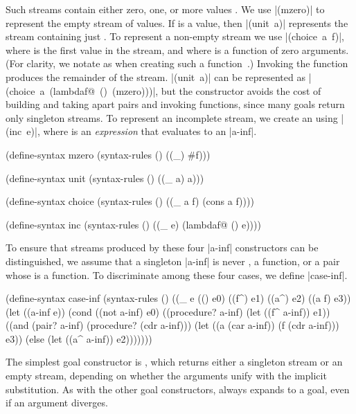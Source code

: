 Such streams contain either zero, one, or more values
\cite{backtracking,CombinatorsforLP%
}.  We use
\mbox{\scheme|(mzero)|} to represent the empty stream of
values. If  is a value, then
\mbox{\scheme|(unit a)|} represents the stream containing
just .  To represent a non-empty stream
we use \mbox{\scheme|(choice a f)|}, where 
is the first value in the stream, and where  is a
function of zero arguments.  (For clarity, we notate 
as  when creating such a function~.)
Invoking the function  produces the remainder of the
stream.
\mbox{\scheme|(unit a)|} can be represented as
\mbox{\scheme|(choice a (lambdaf@ () (mzero)))|}, but the
 constructor avoids the cost of building and taking apart
pairs and invoking functions, since many goals return 
only singleton streams.
To represent an incomplete stream, we create an  using \mbox{\scheme|(inc e)|}, 
where  is an \emph{expression} that evaluates to an \mbox{\scheme|a-inf|}.

\schemedisplayspace
\begin{schemedisplay}
(define-syntax mzero 
  (syntax-rules () 
    ((_) #f)))

(define-syntax unit
  (syntax-rules ()
    ((_ a) a)))

(define-syntax choice
  (syntax-rules ()
    ((_ a f) (cons a f))))

(define-syntax inc
  (syntax-rules ()
    ((_ e) (lambdaf@ () e))))
\end{schemedisplay}

To ensure that streams produced by these four \mbox{\scheme|a-inf|}
constructors can be distinguished, 
we assume that a singleton \mbox{\scheme|a-inf|} is
never , a function, or a pair whose  is a
function.  To discriminate among these four cases, we define
\mbox{\scheme|case-inf|}.

\schemedisplayspace
\begin{schemedisplay}
(define-syntax case-inf
  (syntax-rules ()
    ((_ e (() e0) ((f^) e1) ((a^) e2) ((a f) e3))
     (let ((a-inf e))
       (cond
         ((not a-inf) e0)
         ((procedure? a-inf)  (let ((f^ a-inf)) e1))
         ((and (pair? a-inf) (procedure? (cdr a-inf)))
          (let ((a (car a-inf)) (f (cdr a-inf))) e3))
         (else (let ((a^ a-inf)) e2)))))))
\end{schemedisplay}

The simplest goal constructor is \scheme{==}, which returns either a
singleton stream or an empty stream, depending on whether the
arguments unify with the implicit substitution.  As with the other
goal constructors, \scheme{==} always expands to a goal, even if an
argument diverges.  %

